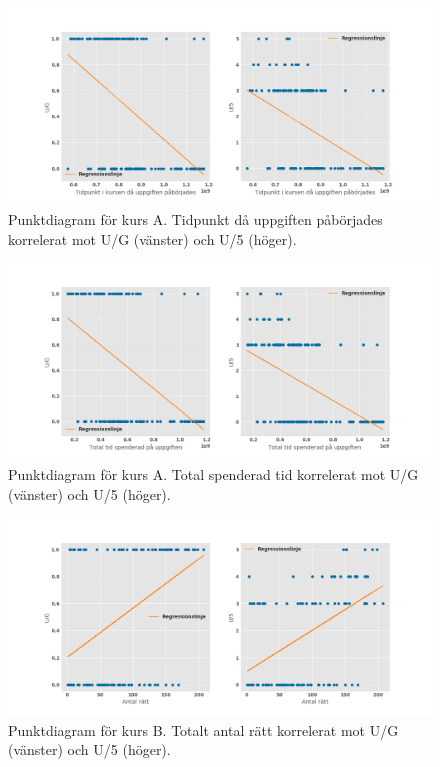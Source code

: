 \begin{figure}[hbtp]
    \centering
    \includegraphics[width=1\textwidth]{images/pktdiagram/mekEg2.png}
    \caption{Punktdiagram för kurs A. Tidpunkt då uppgiften påbörjades korrelerat mot U/G (vänster) och U/5 (höger).}
    \label{fig:pktdigA2}
\end{figure}

\begin{figure}[hbtp]
    \centering
    \includegraphics[width=1\textwidth]{images/pktdiagram/mekEg4.png}
    \caption{Punktdiagram för kurs A. Total spenderad tid korrelerat mot U/G (vänster) och U/5 (höger).}
    \label{fig:pktdigA3}
\end{figure}

\begin{figure}[hbtp]
    \centering
    \includegraphics[width=1\textwidth]{images/pktdiagram/vektEg0.png}
    \caption{Punktdiagram för kurs B. Totalt antal rätt korrelerat mot U/G (vänster) och U/5 (höger).}
    \label{fig:pktdigB1}
\end{figure}

